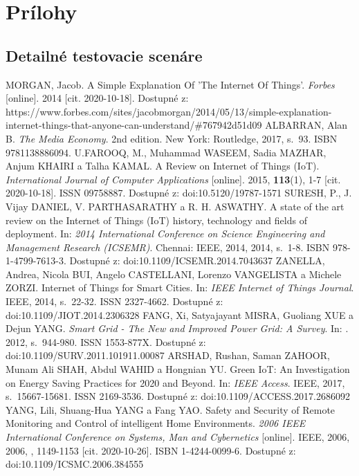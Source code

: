 \documentclass[twoside]{ctuthesis}
\theoremstyle{plain}
\theoremstyle{definition}
\theoremstyle{note}
\begin{document}
\printindex
\appendix
\chapter{Prílohy}
\section{Detailné testovacie scenáre}
\label{sec:scenare}


\appendix
\begin{thebibliography}{46}
 MORGAN, Jacob. A Simple Explanation Of 'The Internet Of Things'. \textit{Forbes} [online]. 2014 [cit. 2020-10-18]. Dostupné z: https://www.forbes.com/sites/jacobmorgan/2014/05/13/simple-explanation-internet-things-that-anyone-can-understand/\#767942d51d09
 ALBARRAN, Alan B. \textit{The Media Economy}. 2nd edition. New York: Routledge, 2017, s.~93. ISBN 9781138886094.
U.FAROOQ, M., Muhammad WASEEM, Sadia MAZHAR, Anjum KHAIRI a Talha KAMAL. A Review on Internet of Things (IoT). \textit{International Journal of Computer Applications} [online]. 2015, \textbf{113}(1), 1-7 [cit. 2020-10-18]. ISSN 09758887. Dostupné z: doi:10.5120/19787-1571
SURESH, P., J. Vijay DANIEL, V. PARTHASARATHY a R. H. ASWATHY. A state of the art review on the Internet of Things (IoT) history, technology and fields of deployment. In: \textit{2014 International Conference on Science Engineering and Management Research (ICSEMR)}. Chennai: IEEE, 2014, 2014, s.~1-8. ISBN 978-1-4799-7613-3. Dostupné z: doi:10.1109/ICSEMR.2014.7043637
 ZANELLA, Andrea, Nicola BUI, Angelo CASTELLANI, Lorenzo VANGELISTA a Michele ZORZI. Internet of Things for Smart Cities. In: \textit{IEEE Internet of Things Journal}. IEEE, 2014, s.~22-32. ISSN 2327-4662. Dostupné z: doi:10.1109/JIOT.2014.2306328
 FANG, Xi, Satyajayant MISRA, Guoliang XUE a Dejun YANG. \textit{Smart Grid - The New and Improved Power Grid: A Survey}. In: . 2012, s.~944-980. ISSN 1553-877X. Dostupné z: doi:10.1109/SURV.2011.101911.00087
ARSHAD, Rushan, Saman ZAHOOR, Munam Ali SHAH, Abdul WAHID a Hongnian YU. Green IoT: An Investigation on Energy Saving Practices for 2020 and Beyond. In: \textit{IEEE Access}. IEEE, 2017, s.~15667-15681. ISSN 2169-3536. Dostupné z: doi:10.1109/ACCESS.2017.2686092
 YANG, Lili, Shuang-Hua YANG a Fang YAO. Safety and Security of Remote Monitoring and Control of intelligent Home Environments. \textit{2006 IEEE International Conference on Systems, Man and Cybernetics} [online]. IEEE, 2006, 2006, , 1149-1153 [cit. 2020-10-26]. ISBN 1-4244-0099-6. Dostupné z: doi:10.1109/ICSMC.2006.384555

\end{thebibliography}
\end{document}
